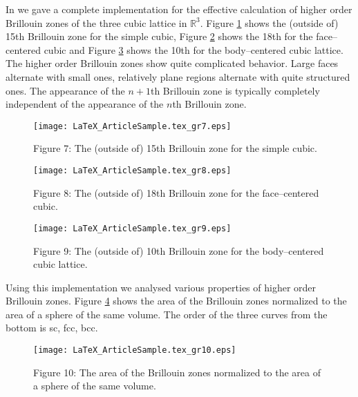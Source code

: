\documentclass{article}
\begin{document}
\noindent In \cite{Trott00B} we gave a complete implementation for
the effective calculation of higher order Brillouin zones of the
three cubic lattice in $\mathbb{R}^{3}$. Figure \ref{XRef-Figure-227124524}
shows the (outside of) 15th Brillouin zone for the simple cubic,
Figure \ref{XRef-Figure-227124514} shows the 18th for the face--centered
cubic and Figure \ref{XRef-Figure-227124459} shows the 10th for
the body--centered cubic lattice. The higher order Brillouin zones
show quite complicated behavior. Large faces alternate with small
ones, relatively plane regions alternate with quite structured ones.
The appearance of the $n+1$th Brillouin zone is typically completely
independent of the appearance of the $n$th Brillouin zone. 
\begin{figure}[h]
\begin{center}
\texttt{[image: LaTeX\_ArticleSample.tex\_gr7.eps]}

\end{center}\label{XRef-Figure-227124524}
\caption{Figure 7: The (outside of) 15th Brillouin zone for the
simple cubic.}
\end{figure}
\begin{figure}[h]
\begin{center}
\texttt{[image: LaTeX\_ArticleSample.tex\_gr8.eps]}

\end{center}\label{XRef-Figure-227124514}
\caption{Figure 8: The (outside of) 18th Brillouin zone for the
face--centered cubic.}
\end{figure}
\begin{figure}[h]
\begin{center}
\texttt{[image: LaTeX\_ArticleSample.tex\_gr9.eps]}

\end{center}\label{XRef-Figure-227124459}
\caption{Figure 9: The (outside of) 10th Brillouin zone for the
body--centered cubic lattice.}
\end{figure}

Using this implementation we analysed various properties of higher
order Brillouin zones. Figure \ref{XRef-Figure-227124436} shows
the area of the Brillouin zones normalized to the area of a sphere
of the same volume. The order of the three curves from the bottom
is sc, fcc, bcc. 
\begin{figure}[h]
\begin{center}
\texttt{[image: LaTeX\_ArticleSample.tex\_gr10.eps]}

\end{center}\label{XRef-Figure-227124436}
\caption{Figure 10: The area of the Brillouin zones normalized to
the area of a sphere of the same volume.}
\end{figure}
\end{document}
